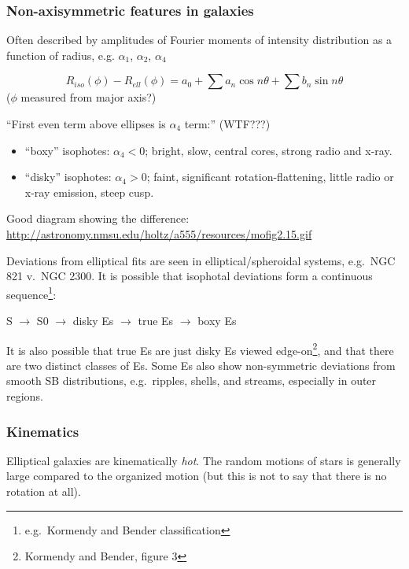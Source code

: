 \documentclass{article}
\newcommand{\mynotes}[1]{\textcolor{cadmiumgreen}{#1}}
\begin{document}
\subsubsection{Non-axisymmetric features in galaxies}
Often described by amplitudes of Fourier moments of intensity distribution as a
function of radius, e.g. $\alpha_{1}$, $\alpha_{2}$, $\alpha_{4}$


\[
    R_{iso}(\phi) - R_{ell}(\phi)
    = a_{0}
    + \sum{ a_{n} \cos{n\theta}  }
    + \sum{ b_{n} \sin{n\theta}  }
    \]
($\phi$ measured from major axis?)

``First even term above ellipses is $\alpha_{4}$ term:'' \mynotes{(WTF???)}
\begin{itemize}
    \item ``boxy'' isophotes: $\alpha_{4} < 0$;
        bright, slow, central cores, strong radio and x-ray.
    \item ``disky'' isophotes: $\alpha_{4} > 0$;
        faint, significant rotation-flattening, little
        radio or x-ray emission, steep cusp.
\end{itemize}
Good diagram showing the difference: \url{http://astronomy.nmsu.edu/holtz/a555/resources/mofig2.15.gif}

Deviations from elliptical fits are seen in elliptical/spheroidal systems,
e.g.\ NGC 821 v.\ NGC 2300. It is possible that isophotal deviations form
a continuous sequence\footnote{e.g.\ Kormendy and Bender classification}:
\begin{center}
    S $\rightarrow$ S0 $\rightarrow$ disky Es $\rightarrow$
    true Es $\rightarrow$ boxy Es
\end{center}
It is also possible that true Es are just disky Es viewed
edge-on\footnote{Kormendy and Bender, figure 3}, and that there are two
distinct classes of Es. Some Es also show non-symmetric deviations from
smooth SB distributions, e.g.\ ripples, shells, and streams, especially
in outer regions.

\subsubsection{Kinematics}
Elliptical galaxies are kinematically \emph{hot}. The random motions of stars
is generally large compared to the organized motion (but this is not to say
that there is no rotation at all).
\end{document}
